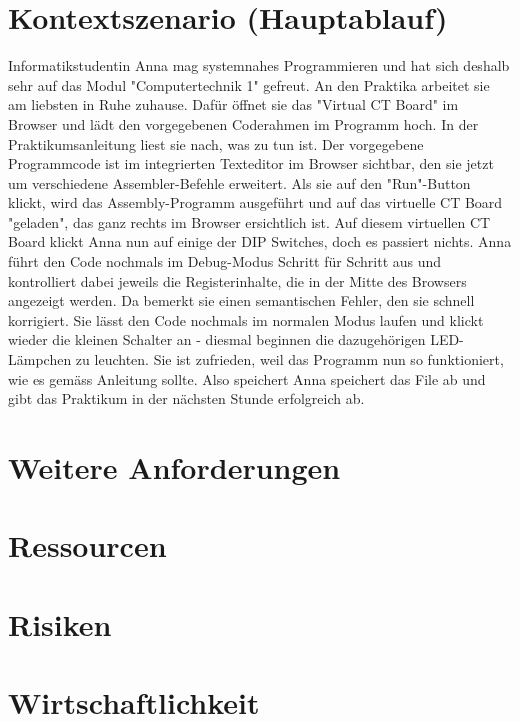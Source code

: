 \documentclass[10pt]{article}
\begin{document}
\section{Kontextszenario (Hauptablauf)}

Informatikstudentin Anna mag systemnahes Programmieren und hat sich deshalb sehr auf das Modul "Computertechnik 1" gefreut. An den Praktika arbeitet sie am liebsten in Ruhe zuhause. Dafür öffnet sie das "Virtual CT Board" im Browser und lädt den vorgegebenen Coderahmen im Programm hoch. In der Praktikumsanleitung liest sie nach, was zu tun ist. Der vorgegebene Programmcode ist im integrierten Texteditor im Browser sichtbar, den sie jetzt um verschiedene Assembler-Befehle erweitert. Als sie auf den "Run"-Button klickt, wird das Assembly-Programm ausgeführt und auf das virtuelle CT Board "geladen", das ganz rechts im Browser ersichtlich ist. 
\newline Auf diesem virtuellen CT Board klickt Anna nun auf einige der DIP Switches, doch es passiert nichts. Anna führt den Code nochmals im Debug-Modus Schritt für Schritt aus und kontrolliert dabei jeweils die Registerinhalte, die in der Mitte des Browsers angezeigt werden. Da bemerkt sie einen semantischen Fehler, den sie schnell korrigiert. Sie lässt den Code nochmals im normalen Modus laufen und klickt wieder die kleinen Schalter an - diesmal beginnen die dazugehörigen LED-Lämpchen zu leuchten. Sie ist zufrieden, weil das Programm nun so funktioniert, wie es gemäss Anleitung sollte. Also speichert Anna speichert das File ab und gibt das Praktikum in der nächsten Stunde erfolgreich ab.

\section{Weitere Anforderungen}

\section{Ressourcen}

\section{Risiken}

\section{Wirtschaftlichkeit}
\end{document}
